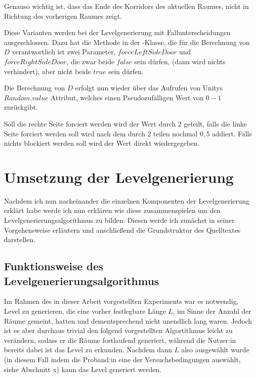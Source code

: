 Genauso wichtig ist, dass das Ende des Korridors des aktuellen Raumes, nicht in Richtung des vorherigen Raumes zeigt.

Diese Varianten werden bei der Levelgenerierung mit Fallunterscheidungen ausgeschlossen. %
Dazu hat die Methode  in der -Klasse, die für die Berechnung von $D$ verantwortlich ist zwei Parameter, $forceLeftSideDoor$ und $forceRightSideDoor$, die zwar beide $false$ sein dürfen, (dann wird nichts verhindert), aber nicht beide $true$ sein dürfen.

Die Berechnung von $D$ erfolgt nun wieder über das Aufrufen von Unitys $Random.value$ Attribut, welches einen Pseudozufälligen Wert von $0-1$ zurückgibt.

Soll die rechte Seite forciert werden wird der Wert durch $2$ geteilt, falls die linke Seite forciert werden soll wird nach dem durch $2$ teilen nochmal $0,5$ addiert. Falls nichts blockiert werden soll wird der Wert direkt wiedergegeben.

\section{Umsetzung der Levelgenerierung}

Nachdem ich nun nacheinander die einzelnen Komponenten der Levelgenerierung erklärt habe werde ich nun erklären wie diese zusammenspielen um den Levelgenerierungsalgorithmus zu bilden. Diesen werde ich zunächst in seiner Vorgehensweise erläutern und anschließend die Grundstruktur des Quelltextes darstellen.

\subsection{Funktionsweise des Levelgenerierungsalgorithmus}
Im Rahmen des in dieser Arbeit vorgestellten Experiments war es notwendig, Level zu generieren, die eine vorher festlegbare Länge $L$, im Sinne der Anzahl der Räume gemeint, hatten und dementsprechend nicht unendlich lang waren. Jedoch ist es aber durchaus trivial den folgend vorgestellten Algortithmus leicht zu verändern, sodass er die Räume fortlaufend generiert, während die Nutzer:in bereits dabei ist das Level zu erkunden. %
Nachdem dann $L$ also ausgewählt wurde (in diesem Fall indem die Proband:in eine der Versuchsbedingungen auswählt, siehe Abschnitt x) %
kann das Level generiert werden.

